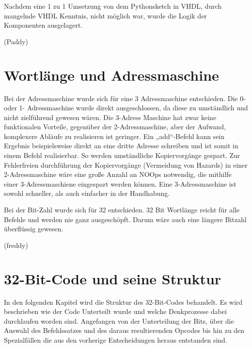 \documentclass[paper=a4,fontsize=12pt,twocolumn]{scrreprt}
\begin{document}
Nachdem eine 1 zu 1 Umsetzung von dem Pythonsketch in VHDL, durch mangelnde VHDL Kenntnis, nicht möglich war, wurde die Logik der Komponenten ausgelagert.



(Paddy)

\section{Wortlänge und Adressmaschine}


Bei der Adressmaschine wurde sich für eine 3 Adressmaschine entschieden.
Die 0- oder 1- Adressmaschine wurde direkt ausgeschlossen, da diese zu umständlich und nicht zielführend gewesen wären.
Die 3-Adress Maschine hat zwar keine funktionalen Vorteile, gegenüber der 2-Adressmaschine, aber der Aufwand, komplexere Abläufe zu realisieren ist geringer.
Ein „add“-Befehl kann sein Ergebnis beispielsweise direkt an eine dritte Adresse schreiben und ist somit in einem Befehl realisierbar.
So werden umständliche Kopiervorgänge gespart.
Zur Fehlerfreien durchführung der Kopiervorgänge (Vermeidung von Hazards) in einer 2-Adressmaschine wäre eine große Anzahl an NOOps notwendig, die mithilfe einer 3-Adressmaschiene eingespart werden können.
Eine 3-Adressmaschine ist sowohl schneller, als auch einfacher in der Handhabung.

Bei der Bit-Zahl wurde sich für 32 entschieden.
32 Bit Wortlänge reicht für alle Befehle und werden nie ganz ausgeschöpft.
Darum wäre auch eine längere Bitzahl überflüssig gewesen.


(freddy)

\section{ 32-Bit-Code und seine Struktur}

In den folgenden Kapitel wird die Struktur des 32-Bit-Codes behandelt.
Es wird beschrieben wie der Code Unterteilt wurde und welche Denkprozesse dabei durchlaufen worden sind.
Angefangen von der Unterteilung der Bits, über die Auswahl des Befehlssatzes und des daraus resultierenden Opcodes bis hin zu den Spezialfällen die aus den vorherige Entscheidungen heraus entstanden sind.
\end{document}
